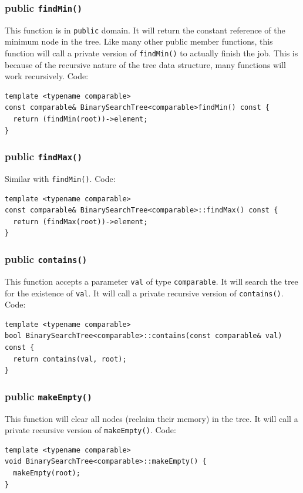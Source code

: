 \documentclass[11pt]{book}
\begin{document}
\subsubsection{public \texttt{findMin()}}
\label{sec:org6ddf514}
This function is in \texttt{public} domain. It will return the constant reference of the minimum node in the tree. Like many other public member functions, this function will call a private version of \texttt{findMin()} to actually finish the job. This is because of the recursive nature of the tree data structure, many functions will work recursively. Code:
\begin{verbatim}
template <typename comparable>
const comparable& BinarySearchTree<comparable>findMin() const {
  return (findMin(root))->element;
}
\end{verbatim}

\subsubsection{public \texttt{findMax()}}
\label{sec:orga158aa8}
Similar with \texttt{findMin()}. Code:
\begin{verbatim}
template <typename comparable>
const comparable& BinarySearchTree<comparable>::findMax() const {
  return (findMax(root))->element;
}
\end{verbatim}

\subsubsection{public \texttt{contains()}}
\label{sec:orgc24b1c7}
This function accepts a parameter \texttt{val} of type \texttt{comparable}. It will search the tree for the existence of \texttt{val}. It will call a private recursive version of \texttt{contains()}. Code:
\begin{verbatim}
template <typename comparable>
bool BinarySearchTree<comparable>::contains(const comparable& val) const {
  return contains(val, root);
}
\end{verbatim}

\subsubsection{public \texttt{makeEmpty()}}
\label{sec:org850faee}
This function will clear all nodes (reclaim their memory) in the tree. It will call a private recursive version of \texttt{makeEmpty()}. Code:
\begin{verbatim}
template <typename comparable>
void BinarySearchTree<comparable>::makeEmpty() {
  makeEmpty(root);
}
\end{verbatim}
\end{document}
